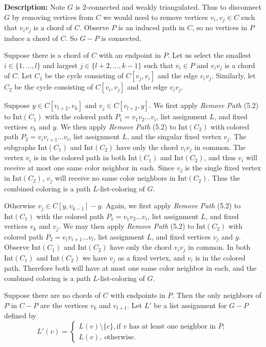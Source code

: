 \documentclass[letterpaper, 12pt]{amsart}
\theoremstyle{definition}
\theoremstyle{definition}
\theoremstyle{thm}
\theoremstyle{definition}
\begin{document}
\noindent\textbf{Description:}
Note $G$ is $2$-connected and weakly triangulated. Thus to disconnect $G$ by
removing vertices from $C$ we would need to remove vertices
$v_i,v_j\in C$ such that $v_iv_j$ is a chord of $C$.
Observe $P$ is an induced path in $C$, so no vertices in $P$ induce a chord of
$C$. So $G-P$ is connected.

Suppose there is a chord of $C$ with an endpoint in $P$. Let us select the
smallest $i\in\{1,\ldots,l\}$ and largest
$j\in\{l+2,\ldots,k-1\}$ such that $v_i\in P$ and $v_iv_j$ is a chord of $C$. Let $C_1$ be the
cycle consisting of $C[v_j,v_i]$ and the edge $v_iv_j$. Similarly, let $C_2$ be
the cycle consisting of $C[v_i,v_j]$ and the edge $v_iv_j$.

Suppose $y\in C[v_{l+2},v_{k}]$ and $v_j\in C[v_{l+2},y]$. 
We first apply \textit{Remove Path} (5.2) to $\text{Int}(C_1)$ with the colored
path $P_1=v_1v_2\ldots v_i$, list assignment $L$, and fixed vertices $v_k$ and $y$.
We then apply \textit{Remove Path} (5.2)
to $\text{Int}(C_2)$ with colored path $P_2=v_iv_{i+1}\ldots v_l$, list
assignment $L$, and the singular fixed vertex $v_j$. The subgraphs
$\text{Int}(C_1)$ and $\text{Int}(C_2)$ have only the chord $v_iv_j$ in common.
The vertex $v_i$ is in the colored path in both $\text{Int}(C_1)$ and $\text{Int}(C_2)$,
and thus $v_i$ will receive at most one same color neighbor in each.
Since $v_j$ is the single fixed vertex in $\text{Int}(C_2)$, $v_j$ will receive
no same color neighbors in $\text{Int}(C_2)$. Thus the combined coloring is a
path $L$-list-coloring of $G$.

Otherwise $v_j\in C[y,v_{k-1}]-y$. Again, we first apply \textit{Remove Path} (5.2) to
$\text{Int}(C_1)$ with the colored path $P_1=v_1v_2\ldots v_i$, list assignment
$L$, and fixed vertices $v_k$ and $v_j$. We may then apply \textit{Remove Path}
(5.2) to $\text{Int}(C_2)$ with colored
path $P_2=v_iv_{i+1}\ldots v_l$, list assignment $L$, and fixed vertices $v_j$
and $y$. Observe $\text{Int}(C_1)$ and $\text{Int}(C_2)$ have only the chord
$v_iv_j$ in common. In both $\text{Int}(C_1)$ and $\text{Int}(C_2)$ we have
$v_j$ as a fixed vertex, and $v_i$ is in the colored path. Therefore both
will have at most one same color neighbor in each, and the combined coloring
is a path $L$-list-coloring of $G$.

Suppose there are no chords of $C$ with endpoints in $P$.
Then the only neighbors of $P$ in $C-P$ are the vertices $v_k$ and $v_{l+1}$.
Let $L'$ be a list assignment for $G-P$ defined by
\[
	L'(v) = \begin{cases}
				L(v)\setminus\{c\}, \text{if } v \text{ has at least one neighbor in } P;\\
				L(v), \ \text{otherwise}.
			\end{cases}
\]
\end{document}
